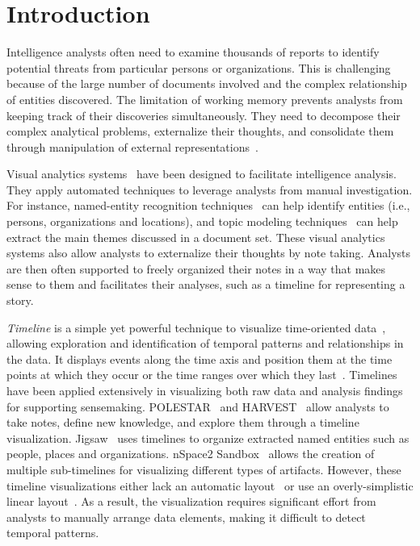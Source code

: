 \section{Introduction}
Intelligence analysts often need to examine thousands of reports to identify potential threats from particular persons or organizations. This is challenging because of the large number of documents involved and the complex relationship of entities discovered. The limitation of working memory prevents analysts from keeping track of their discoveries simultaneously. They need to decompose their complex analytical problems, externalize their thoughts, and consolidate them through manipulation of external representations~\cite{Heuer1999}.

Visual analytics systems~\cite{Pioch2006,Wright2006,Stasko2007} have been designed to facilitate intelligence analysis. They apply automated techniques to leverage analysts from manual investigation. For instance, named-entity recognition techniques~\cite{Nadeau2007} can help identify entities (i.e., persons, organizations and locations), and topic modeling techniques~\cite{Blei2003} can help extract the main themes discussed in a document set. These visual analytics systems also allow analysts to externalize their thoughts by note taking. Analysts are then often supported to freely organized their notes in a way that makes sense to them and facilitates their analyses, such as a timeline for representing a story.

\emph{Timeline} is a simple yet powerful technique to visualize time-oriented data~\cite{Tufte1983}, allowing exploration and identification of temporal patterns and relationships in the data. It displays events along the time axis and position them at the time points at which they occur or the time ranges over which they last~\cite{Plaisant1996}. Timelines have been applied extensively in visualizing both raw data and analysis findings for supporting sensemaking. POLESTAR~\cite{Pioch2006} and HARVEST~\cite{Gotz2006} allow analysts to take notes, define new knowledge, and explore them through a timeline visualization. Jigsaw~\cite{Gorg2013} uses timelines to organize extracted named entities such as people, places and organizations. nSpace2 Sandbox~\cite{SandboxTimeline2012} allows the creation of multiple sub-timelines for visualizing different types of artifacts. However, these timeline visualizations either lack an automatic layout~\cite{Pioch2006} or use an overly-simplistic linear layout~\cite{SandboxTimeline2012}. As a result, the visualization requires significant effort from analysts to manually arrange data elements, making it difficult to detect temporal patterns.

